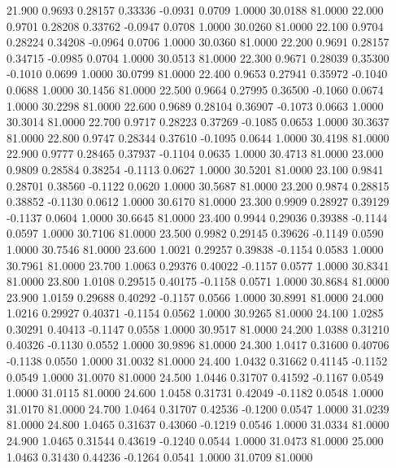   21.900   0.9693   0.28157   0.33336  -0.0931   0.0709   1.0000  30.0188  81.0000
  22.000   0.9701   0.28208   0.33762  -0.0947   0.0708   1.0000  30.0260  81.0000
  22.100   0.9704   0.28224   0.34208  -0.0964   0.0706   1.0000  30.0360  81.0000
  22.200   0.9691   0.28157   0.34715  -0.0985   0.0704   1.0000  30.0513  81.0000
  22.300   0.9671   0.28039   0.35300  -0.1010   0.0699   1.0000  30.0799  81.0000
  22.400   0.9653   0.27941   0.35972  -0.1040   0.0688   1.0000  30.1456  81.0000
  22.500   0.9664   0.27995   0.36500  -0.1060   0.0674   1.0000  30.2298  81.0000
  22.600   0.9689   0.28104   0.36907  -0.1073   0.0663   1.0000  30.3014  81.0000
  22.700   0.9717   0.28223   0.37269  -0.1085   0.0653   1.0000  30.3637  81.0000
  22.800   0.9747   0.28344   0.37610  -0.1095   0.0644   1.0000  30.4198  81.0000
  22.900   0.9777   0.28465   0.37937  -0.1104   0.0635   1.0000  30.4713  81.0000
  23.000   0.9809   0.28584   0.38254  -0.1113   0.0627   1.0000  30.5201  81.0000
  23.100   0.9841   0.28701   0.38560  -0.1122   0.0620   1.0000  30.5687  81.0000
  23.200   0.9874   0.28815   0.38852  -0.1130   0.0612   1.0000  30.6170  81.0000
  23.300   0.9909   0.28927   0.39129  -0.1137   0.0604   1.0000  30.6645  81.0000
  23.400   0.9944   0.29036   0.39388  -0.1144   0.0597   1.0000  30.7106  81.0000
  23.500   0.9982   0.29145   0.39626  -0.1149   0.0590   1.0000  30.7546  81.0000
  23.600   1.0021   0.29257   0.39838  -0.1154   0.0583   1.0000  30.7961  81.0000
  23.700   1.0063   0.29376   0.40022  -0.1157   0.0577   1.0000  30.8341  81.0000
  23.800   1.0108   0.29515   0.40175  -0.1158   0.0571   1.0000  30.8684  81.0000
  23.900   1.0159   0.29688   0.40292  -0.1157   0.0566   1.0000  30.8991  81.0000
  24.000   1.0216   0.29927   0.40371  -0.1154   0.0562   1.0000  30.9265  81.0000
  24.100   1.0285   0.30291   0.40413  -0.1147   0.0558   1.0000  30.9517  81.0000
  24.200   1.0388   0.31210   0.40326  -0.1130   0.0552   1.0000  30.9896  81.0000
  24.300   1.0417   0.31600   0.40706  -0.1138   0.0550   1.0000  31.0032  81.0000
  24.400   1.0432   0.31662   0.41145  -0.1152   0.0549   1.0000  31.0070  81.0000
  24.500   1.0446   0.31707   0.41592  -0.1167   0.0549   1.0000  31.0115  81.0000
  24.600   1.0458   0.31731   0.42049  -0.1182   0.0548   1.0000  31.0170  81.0000
  24.700   1.0464   0.31707   0.42536  -0.1200   0.0547   1.0000  31.0239  81.0000
  24.800   1.0465   0.31637   0.43060  -0.1219   0.0546   1.0000  31.0334  81.0000
  24.900   1.0465   0.31544   0.43619  -0.1240   0.0544   1.0000  31.0473  81.0000
  25.000   1.0463   0.31430   0.44236  -0.1264   0.0541   1.0000  31.0709  81.0000
